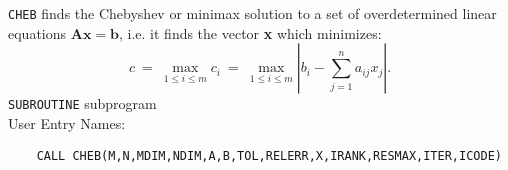                            
        
                       
{\tt CHEB} finds the Chebyshev or minimax solution to a set of
overdetermined linear equations
$\mathbf{Ax=b}$, i.e. it finds the vector {\bf x} which minimizes:
$$ c \ = \ \max_{1\leq i\leq m} c_i \ = \ \max_{1\leq i\leq m}
\left| b_i - \sum_{j=1}^n a_{ij}x_j \right|.$$
\Structure
{\tt SUBROUTINE} subprogram \\
User Entry Names: 
\Usage
\begin{verbatim}
    CALL CHEB(M,N,MDIM,NDIM,A,B,TOL,RELERR,X,IRANK,RESMAX,ITER,ICODE)
\end{verbatim}
